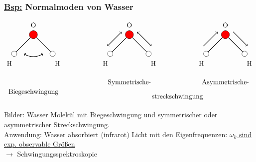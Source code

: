 \documentclass[titlepage,12pt,a4paper,ngerman]{report}
\begin{document}
{\subsubsection{\underline{Bsp:} Normalmoden von Wasser}
$$
\begin{tikzpicture}
\node[circle,fill=red, draw=black,inner sep=1.5mm] (a) at (0,0) {};
\node[circle,fill=red, draw=black,inner sep=1.5mm] (b) at (5,0) {};
\node[circle,fill=red, draw=black,inner sep=1.5mm] (c) at (10,0) {};
\node[circle,fill=white, draw=black, inner sep=1mm] (a1) at (-1,-1) {};
\node[circle,fill=white, draw=black, inner sep=1mm] (a2) at (1,-1) {};
\node[circle,fill=white, draw=black, inner sep=1mm] (b1) at (4,-1) {};
\node[circle,fill=white, draw=black, inner sep=1mm] (b2) at (6,-1) {};
\node[circle,fill=white, draw=black, inner sep=1mm] (c1) at (9,-1) {};
\node[circle,fill=white, draw=black, inner sep=1mm] (c2) at (11,-1) {};
\draw[thick,-] (a1) -- (a);
\draw[thick,-] (a2) -- (a);
\draw[thick,-] (b1) -- (b);
\draw[thick,-] (b2) -- (b);
\draw[thick,-] (c1) -- (c);
\draw[thick,-] (c2) -- (c);
\node at (0,.5) {O};
\node at (-1.25,-1.5) {H};
\node at (1.25,-1.5) {H};
\node at (5,.5) {O};
\node at (5-1.25,-1.5) {H};
\node at (5+1.25,-1.5) {H};
\node at (10,.5) {O};
\node at (10-1.25,-1.5) {H};
\node at (11.25,-1.5) {H};
\draw [<->,black,thick] (0.5,-1) to [out=-150,in=-30] (-0.5,-1);
\draw [<->,black,thick] (5-0.25-.15,0+.15) to (4-.15,-1+0.25+.15);
\draw [<->,black,thick] (5+0.25+.15,0+.15) to (6+.15,-1+0.25+.15);
\draw [<-,black,thick] (10-0.25-.15,0+.15) to (9-.15,-1+0.25+.15);
\draw [->,black,thick] (10+0.25+.15,0+.15) to (11+.15,-1+0.25+.15);
\node at (0,-3) {Biegeschwingung};
\node at (5,-2.5) {Symmetrische-};
\node at (10,-2.5) {Asymmetrische-};
\node at (7.5,-3.25) {streckschwingung};
\end{tikzpicture}
$$

\noindent
Bilder: Wasser Molekül mit Biegeschwingung und symmetrischer oder asymmetrischer Streckschwingung.\\[5pt]
Anwendung: Wasser absorbiert (infrarot) Licht mit den Eigenfrequenzen: \underline{$\omega_k$ sind exp. observable Größen}\\
$\rightarrow$ Schwingungsspektroskopie




}
\end{document}
